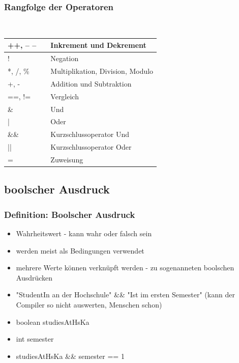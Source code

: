 \documentclass[final]{beamer}
\begin{document}
\begin{frame}
	\frametitle{Rangfolge der Operatoren}
	\\
	\begin{center}
	\begin{tabular}{|l c | l|}
		\hline
		++, -- --  & &  Inkrement und Dekrement \\
		\hline
		! & & Negation \\ \hline

		*, /, \% & & Multiplikation, Division, Modulo \\ \hline
		+, - & & Addition und Subtraktion \\ \hline
		==, != & & Vergleich \\ \hline
		\& & & Und \\ \hline
		| & & Oder \\ \hline
		\&\& & & Kurzschlussoperator Und \\ \hline
		|| & & Kurzschlussoperator Oder \\ \hline
		= & & Zuweisung \\
		\hline
	\end{tabular}
	\end{center}
\end{frame}

\subsection{boolscher Ausdruck}
\begin{frame}
	\frametitle{Definition: Boolscher Ausdruck}
	\begin{itemize}
		\item{Wahrheitswert - kann wahr oder falsch sein}
		\item{werden meist als Bedingungen verwendet}
		\item{mehrere Werte können verknüpft werden - zu sogenanneten boolschen Ausdrücken}
		\item{"StudentIn an der Hochschule" \&\& "Ist im ersten Semester" (kann der Compiler so nicht auswerten, Menschen schon)}
		\pause
		\item{boolean studiesAtHsKa}
		\item{int semester}
		\pause
		\item{studiesAtHsKa \&\& semester == 1}
	\end{itemize}
\end{frame}
\end{document}
